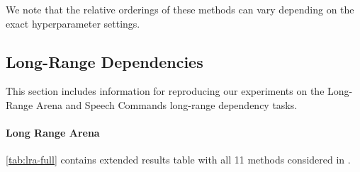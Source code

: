 \documentclass{article}
\begin{document}
We note that the relative orderings of these methods can vary depending on the exact hyperparameter settings.

\subsection{Long-Range Dependencies}
\label{sec:experiment-details-lrd}
This section includes information for reproducing our experiments on the Long-Range Arena and Speech Commands long-range dependency tasks.

\paragraph{Long Range Arena}

\cref{tab:lra-full} contains extended results table with all 11 methods considered in \citep{tay2021long}.
\end{document}
